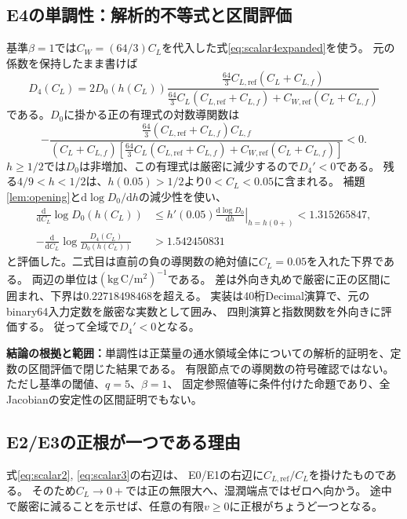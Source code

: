 \documentclass[a4paper,11pt]{ltjsarticle}
\newcommand{\dd}{\mathrm{d}}
\newcommand{\evidence}[1]{\par\smallskip\noindent\textbf{結論の根拠と範囲：}#1\par\smallskip}
\begin{document}
\subsection{E4の単調性：解析的不等式と区間評価}
基準$\beta=1$では$C_W=(64/3)C_L$を代入した式\eqref{eq:scalar4expanded}を使う。
元の係数を保持したまま書けば
\begin{equation}\label{eq:D4}
 D_4(C_L)=2D_0(h(C_L))
 \frac{\frac{64}{3}C_{L,\mathrm{ref}}(C_L+C_{L,f})}
 {\frac{64}{3}C_L(C_{L,\mathrm{ref}}+C_{L,f})+
  C_{W,\mathrm{ref}}(C_L+C_{L,f})}
\end{equation}
である。$D_0$に掛かる正の有理式の対数導関数は
\begin{equation}
 -\frac{\frac{64}{3}(C_{L,\mathrm{ref}}+C_{L,f})C_{L,f}}
 {(C_L+C_{L,f})
 [\frac{64}{3}C_L(C_{L,\mathrm{ref}}+C_{L,f})
       +C_{W,\mathrm{ref}}(C_L+C_{L,f})]}<0 .
\end{equation}
$h\ge1/2$では$D_0$は非増加、この有理式は厳密に減少するので$D_4'<0$である。
残る$4/9<h<1/2$は、$h(0.05)>1/2$より$0<C_L<0.05$に含まれる。
補題\ref{lem:opening}と$\dd\log D_0/\dd h$の減少性を使い、
\begin{align}
 \frac{\dd}{\dd C_L}\log D_0(h(C_L))
 &\le h'(0.05)\left.\frac{\dd\log D_0}{\dd h}\right|_{h=h(0+)}
 <1.315265847,\\
 -\frac{\dd}{\dd C_L}\log\frac{D_4(C_L)}{D_0(h(C_L))}
 &>1.542450831
\end{align}
と評価した。二式目は直前の負の導関数の絶対値に$C_L=0.05$を入れた下界である。
両辺の単位は$(\mathrm{kg\,C/m^2})^{-1}$である。
差は外向き丸めで厳密に正の区間に囲まれ、下界は$0.22718498468$を超える。
実装は40桁Decimal演算で、元のbinary64入力定数を厳密な実数として囲み、
四則演算と指数関数を外向きに評価する。
従って全域で$D_4'<0$となる。
\evidence{単調性は正葉量の通水領域全体についての解析的証明を、定数の区間評価で閉じた結果である。
有限節点での導関数の符号確認ではない。ただし基準の閾値、$q=5$、$\beta=1$、
固定参照値等に条件付けた命題であり、全Jacobianの安定性の区間証明でもない。}

\subsection{E2/E3の正根が一つである理由}\label{sec:roots23}
式\eqref{eq:scalar2}, \eqref{eq:scalar3}の右辺は、
E0/E1の右辺に$C_{L,\mathrm{ref}}/C_L$を掛けたものである。
そのため$C_L\to0+$では正の無限大へ、湿潤端点ではゼロへ向かう。
途中で厳密に減ることを示せば、任意の有限$v\ge0$に正根がちょうど一つとなる。
\end{document}
